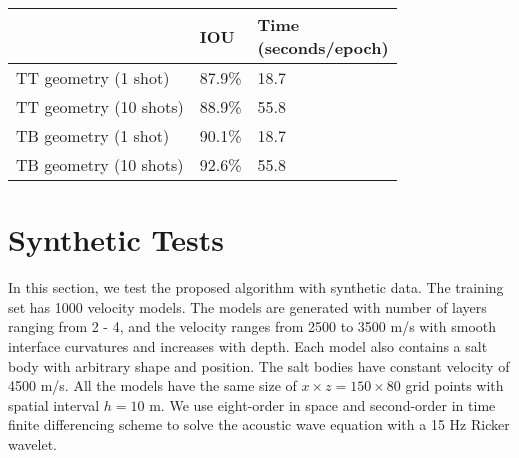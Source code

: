 \documentclass{segabs}
\begin{document}
{
  \begin{center}
  \begin{tabular}{|l|l|l|}
  \hline
                            & IOU    & \makecell{Time \\(seconds/epoch)} \\ \hline
  {TT geometry (1 shot)}    & 87.9\% & 18.7          \\ \hline
  {TT geometry (10 shots)}  & 88.9\% & 55.8          \\ \hline
  {TB geometry (1 shot)}    & 90.1\% & 18.7          \\ \hline
  {TB geometry (10 shots)}  & 92.6\% & 55.8          \\ \hline
  \end{tabular}
  \end{center}
}



\section{Synthetic Tests}
In this section, we test the proposed algorithm with synthetic data. 
The training set has 1000 velocity models. The models are generated with number of layers ranging from 2 - 4, and the velocity ranges from 2500 to 3500 m/s with smooth interface curvatures and increases with depth. Each model also contains a salt body with arbitrary shape and position. The salt bodies have constant velocity of 4500 m/s. All the models have the same size of $x\times z = 150 \times 80$ grid points with spatial interval $h=10$ m. 
We use eight-order in space and second-order in time finite differencing scheme to solve the acoustic wave equation with a 15 Hz Ricker wavelet.
\end{document}
